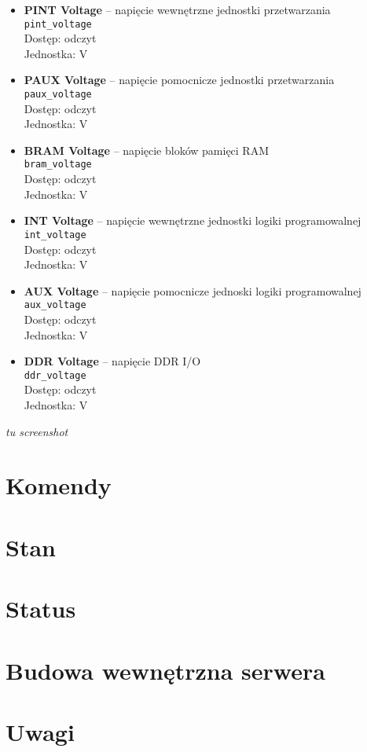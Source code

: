 \documentclass[12pt,a4paper]{article}
\begin{document}
	\begin{itemize}
		\item \textbf{PINT Voltage} -- napięcie wewnętrzne jednostki przetwarzania\\
			  \texttt{pint\_voltage}\\
			  Dostęp: odczyt\\
			  Jednostka: V\\
		\item \textbf{PAUX Voltage} -- napięcie pomocnicze jednostki przetwarzania\\
			  \texttt{paux\_voltage}\\
			  Dostęp: odczyt\\
			  Jednostka: V\\
		\item \textbf{BRAM Voltage} -- napięcie bloków pamięci RAM\\
			  \texttt{bram\_voltage}\\
			  Dostęp: odczyt\\
			  Jednostka: V\\
		\item \textbf{INT Voltage} -- napięcie wewnętrzne jednostki logiki programowalnej\\
			  \texttt{int\_voltage}\\
			  Dostęp: odczyt\\
			  Jednostka: V\\
		\item \textbf{AUX Voltage} -- napięcie pomocnicze jednoski logiki programowalnej\\
			  \texttt{aux\_voltage}\\
			  Dostęp: odczyt\\
			  Jednostka: V\\
		\item \textbf{DDR Voltage} -- napięcie DDR I/O\\
			  \texttt{ddr\_voltage}\\
			  Dostęp: odczyt\\
			  Jednostka: V\\
	\end{itemize}
	\emph{tu screenshot}

	\section{Komendy}

	\section{Stan}

	\section{Status}

	\section{Budowa wewnętrzna serwera}

	\section{Uwagi}
\end{document}
